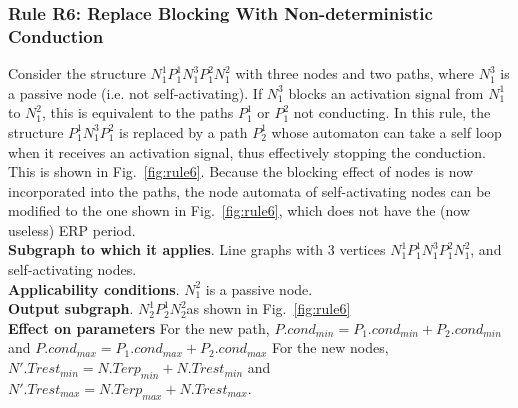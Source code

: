 \subsubsection{Rule R6: Replace Blocking With Non-deterministic Conduction}
Consider the structure $N_1^1 P_1^1 N_1^3 P_1^2 N_1^2$ with three nodes and two paths, where $N_1^3$ is a passive node (i.e. not self-activating).
If $N_1^3$ blocks an activation signal from $N_1^1$ to $N_1^2$, this is equivalent to the paths $P_1^1$ or $P_1^2$ not conducting.
In this rule, the structure $P_1^1 N_1^3 P_1^2$ is replaced by a path $P_2^1$ whose automaton can take a self loop when it receives an activation signal, thus effectively stopping the conduction. 
This is shown in Fig.~\ref{fig:rule6}.
Because the blocking effect of nodes is now incorporated into the paths, the node automata of self-activating nodes can be modified to the one shown in Fig.~\ref{fig:rule6}, which does not have the (now useless) ERP period.
\\
\textbf{Subgraph to which it applies}.
Line graphs with 3 vertices $N_1^1 P_1^1 N_1^3 P_1^2 N_1^2$, and self-activating nodes.\\
\textbf{Applicability conditions}.
$N_1^2$ is a passive node.\\
\textbf{Output subgraph}.
$N_2^1 P_2^1 N_2^2$as shown in Fig.~\ref{fig:rule6}\\
\textbf{Effect on parameters}
For the new path, $P.cond_{min}=P_1.cond_{min}+P_2.cond_{min}$ and 
$P.cond_{max}=P_1.cond_{max}+P_2.cond_{max}$
For the new nodes, $N'.Trest_{min}=N.Terp_{min}+N.Trest_{min}$ and 
$N'.Trest_{max}=N.Terp_{max}+N.Trest_{max}$.\\


